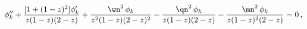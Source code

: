 \begin{equation}
 \phi_k'' + {[1+(1-z)^2]  \phi_k' \over z (1-z)(2-z)} +
{\wn^2\, \phi_k \over  z^2(1-z)(2-z)^2}
- {\qn^2 \, \phi_k \over  z (1-z)(2-z)}
 -
 {\mn^2  \, \phi_k\over z (1-z)^2 (2 - z)}
 = 0\,,
\label{eq_scal}
\end{equation}


